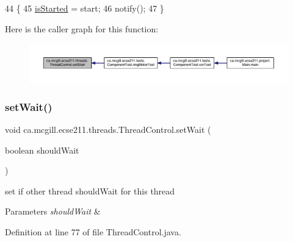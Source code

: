 \begin{DoxyCode}
44                                                    \{
45     \hyperlink{classca_1_1mcgill_1_1ecse211_1_1threads_1_1_thread_control_a92f4933511db42476e39956246bcf2fe}{isStarted} = start;
46     notify();
47   \}
\end{DoxyCode}
Here is the caller graph for this function\+:\nopagebreak
\begin{figure}[H]
\begin{center}
\leavevmode
\includegraphics[width=350pt]{classca_1_1mcgill_1_1ecse211_1_1threads_1_1_thread_control_a16221cdc4ccf637b190934549c708e1f_icgraph}
\end{center}
\end{figure}
\mbox{\label{classca_1_1mcgill_1_1ecse211_1_1threads_1_1_thread_control_a7759a6f52b56e15cb37cd25ea31c93c1}} 
\subsubsection{\texorpdfstring{set\+Wait()}{setWait()}}
{\footnotesize\ttfamily void ca.\+mcgill.\+ecse211.\+threads.\+Thread\+Control.\+set\+Wait (\begin{DoxyParamCaption}\item[{boolean}]{should\+Wait }\end{DoxyParamCaption})}

set if other thread should\+Wait for this thread 
\begin{DoxyParams}{Parameters}
{\em should\+Wait} & \\
\hline
\end{DoxyParams}


Definition at line 77 of file Thread\+Control.\+java.


